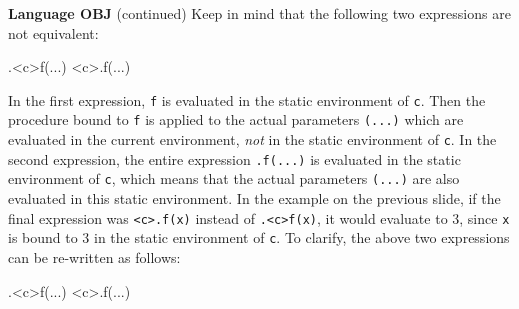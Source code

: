 \begin{minipage}[t]{\sw}
\slidenumber
\LARGE
{\bf Language OBJ} (continued)\exx
Keep in mind that the following two expressions are not equivalent:
\begin{qv}
.<c>f(...)
<c>.f(...)
\end{qv}
In the first expression, \verb'f' is evaluated
in the static environment of \verb'c'.
Then the procedure bound to \verb'f' is applied
to the actual parameters \verb'(...)'
which are evaluated in the current environment,
{\em not} in the static environment of \verb'c'.\exx
In the second expression, the entire expression
\verb'.f(...)' is evaluated in the static environment of \verb'c',
which means that the actual parameters \verb'(...)'
are also evaluated in this static environment.\exx
In the example on the previous slide,
if the final expression was \verb'<c>.f(x)' instead of \verb'.<c>f(x)',
it would evaluate to 3,
since \verb'x' is bound to 3 in the static environment of \verb'c'.\exx
To clarify, the above two expressions can be re-written as follows:
\begin{qv}
.{<c>f}(...)
<c>{.f(...)}
\end{qv}
\end{minipage}
